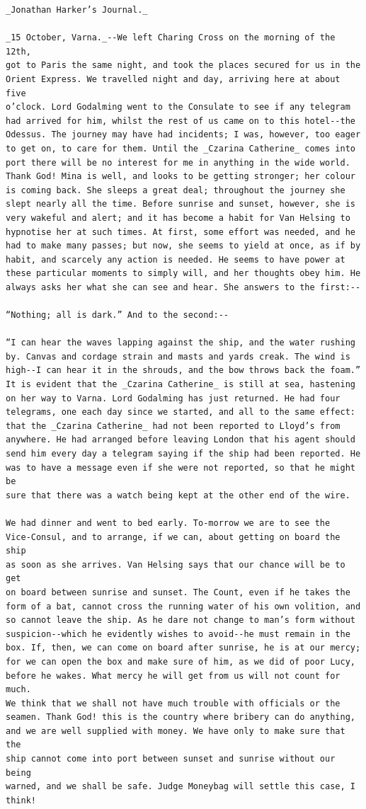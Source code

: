 \documentclass{article}
\begin{document}
\begin{verbatim}
_Jonathan Harker’s Journal._

_15 October, Varna._--We left Charing Cross on the morning of the 12th,
got to Paris the same night, and took the places secured for us in the
Orient Express. We travelled night and day, arriving here at about five
o’clock. Lord Godalming went to the Consulate to see if any telegram
had arrived for him, whilst the rest of us came on to this hotel--the
Odessus. The journey may have had incidents; I was, however, too eager
to get on, to care for them. Until the _Czarina Catherine_ comes into
port there will be no interest for me in anything in the wide world.
Thank God! Mina is well, and looks to be getting stronger; her colour
is coming back. She sleeps a great deal; throughout the journey she
slept nearly all the time. Before sunrise and sunset, however, she is
very wakeful and alert; and it has become a habit for Van Helsing to
hypnotise her at such times. At first, some effort was needed, and he
had to make many passes; but now, she seems to yield at once, as if by
habit, and scarcely any action is needed. He seems to have power at
these particular moments to simply will, and her thoughts obey him. He
always asks her what she can see and hear. She answers to the first:--

“Nothing; all is dark.” And to the second:--

“I can hear the waves lapping against the ship, and the water rushing
by. Canvas and cordage strain and masts and yards creak. The wind is
high--I can hear it in the shrouds, and the bow throws back the foam.”
It is evident that the _Czarina Catherine_ is still at sea, hastening
on her way to Varna. Lord Godalming has just returned. He had four
telegrams, one each day since we started, and all to the same effect:
that the _Czarina Catherine_ had not been reported to Lloyd’s from
anywhere. He had arranged before leaving London that his agent should
send him every day a telegram saying if the ship had been reported. He
was to have a message even if she were not reported, so that he might be
sure that there was a watch being kept at the other end of the wire.

We had dinner and went to bed early. To-morrow we are to see the
Vice-Consul, and to arrange, if we can, about getting on board the ship
as soon as she arrives. Van Helsing says that our chance will be to get
on board between sunrise and sunset. The Count, even if he takes the
form of a bat, cannot cross the running water of his own volition, and
so cannot leave the ship. As he dare not change to man’s form without
suspicion--which he evidently wishes to avoid--he must remain in the
box. If, then, we can come on board after sunrise, he is at our mercy;
for we can open the box and make sure of him, as we did of poor Lucy,
before he wakes. What mercy he will get from us will not count for much.
We think that we shall not have much trouble with officials or the
seamen. Thank God! this is the country where bribery can do anything,
and we are well supplied with money. We have only to make sure that the
ship cannot come into port between sunset and sunrise without our being
warned, and we shall be safe. Judge Moneybag will settle this case, I
think!


\end{verbatim}
\end{document}
